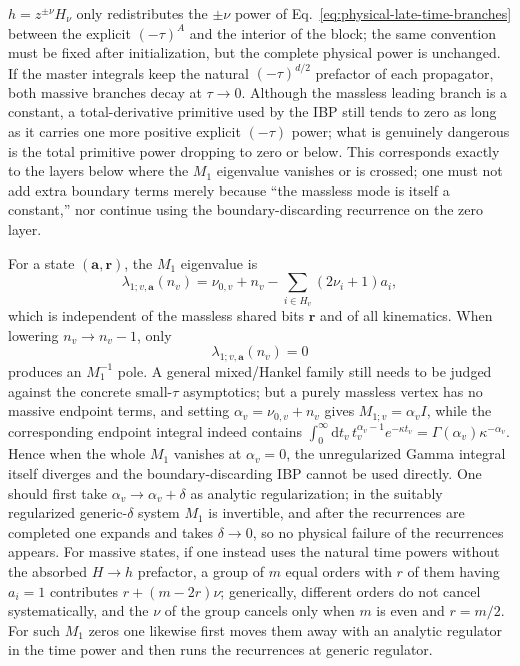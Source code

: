 \documentclass[11pt,a4paper]{article}
\newcommand{\dd}{\mathrm d}
\begin{document}
$h=z^{\pm\nu}H_\nu$ only redistributes the $\pm\nu$ power of Eq.~\eqref{eq:physical-late-time-branches} between the explicit $(-\tau)^A$ and the interior of the block; the same convention must be fixed after initialization, but the complete physical power is unchanged. If the master integrals keep the natural $(-\tau)^{d/2}$ prefactor of each propagator, both massive branches decay at $\tau\to0$. Although the massless leading branch is a constant, a total-derivative primitive used by the IBP still tends to zero as long as it carries one more positive explicit $(-\tau)$ power; what is genuinely dangerous is the total primitive power dropping to zero or below. This corresponds exactly to the layers below where the $M_1$ eigenvalue vanishes or is crossed; one must not add extra boundary terms merely because ``the massless mode is itself a constant,'' nor continue using the boundary-discarding recurrence on the zero layer.

For a state $(\bm a,\bm r)$, the $M_1$ eigenvalue is
\begin{equation}
 \lambda_{1;v,\bm a}(n_v)
 =\nu_{0,v}+n_v
 -\sum_{i\in H_v}(2\nu_i+1)a_i,
 \label{eq:M1-general-eigenvalue}
\end{equation}
which is independent of the massless shared bits $\bm r$ and of all kinematics. When lowering $n_v\to n_v-1$, only
\begin{equation}
 \lambda_{1;v,\bm a}(n_v)=0
 \label{eq:M1-lowering-resonance}
\end{equation}
produces an $M_1^{-1}$ pole. A general mixed/Hankel family still needs to be judged against the concrete small-$\tau$ asymptotics; but a purely massless vertex has no massive endpoint terms, and setting $\alpha_v=\nu_{0,v}+n_v$ gives $M_{1;v}=\alpha_v I$, while the corresponding endpoint integral indeed contains $\int_0^\infty\!\dd t_v\,t_v^{\alpha_v-1}e^{-\kappa t_v}=\Gamma(\alpha_v)\kappa^{-\alpha_v}$. Hence when the whole $M_1$ vanishes at $\alpha_v=0$, the unregularized Gamma integral itself diverges and the boundary-discarding IBP cannot be used directly. One should first take $\alpha_v\to\alpha_v+\delta$ as analytic regularization; in the suitably regularized generic-$\delta$ system $M_1$ is invertible, and after the recurrences are completed one expands and takes $\delta\to0$, so no physical failure of the recurrences appears. For massive states, if one instead uses the natural time powers without the absorbed $H\to h$ prefactor, a group of $m$ equal orders with $r$ of them having $a_i=1$ contributes $r+(m-2r)\nu$; generically, different orders do not cancel systematically, and the $\nu$ of the group cancels only when $m$ is even and $r=m/2$. For such $M_1$ zeros one likewise first moves them away with an analytic regulator in the time power and then runs the recurrences at generic regulator.
\end{document}
